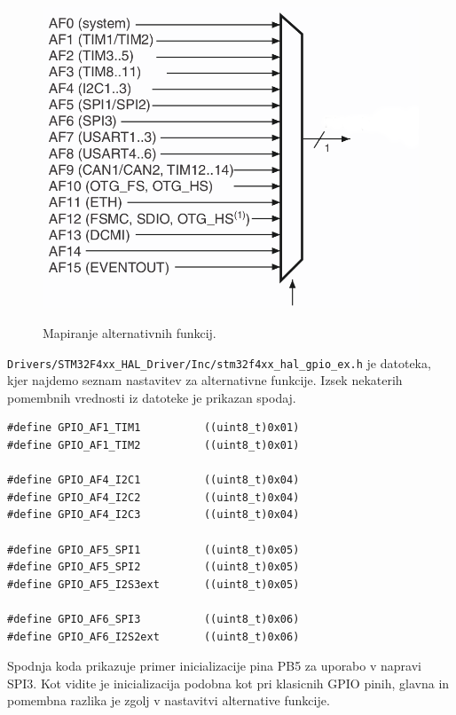 \documentclass[12pt,letterpaper]{article}
\begin{document}
\begin{figure}[ht!]
  \centering
  \caption{Mapiranje alternativnih funkcij.}
  \includegraphics{images/vaja5/SPI_AF.png}
  \label{SPI_AF}
\end{figure}

\texttt{Drivers/STM32F4xx\_HAL\_Driver/Inc/stm32f4xx\_hal\_gpio\_ex.h} je datoteka, kjer najdemo seznam nastavitev za alternativne funkcije. Izsek nekaterih pomembnih vrednosti iz datoteke je prikazan spodaj.

\begin{center}
\begin{lstlisting}[style=CStyle]
#define GPIO_AF1_TIM1          ((uint8_t)0x01)
#define GPIO_AF1_TIM2          ((uint8_t)0x01)

#define GPIO_AF4_I2C1          ((uint8_t)0x04)
#define GPIO_AF4_I2C2          ((uint8_t)0x04)
#define GPIO_AF4_I2C3          ((uint8_t)0x04)

#define GPIO_AF5_SPI1          ((uint8_t)0x05)
#define GPIO_AF5_SPI2          ((uint8_t)0x05)
#define GPIO_AF5_I2S3ext       ((uint8_t)0x05)

#define GPIO_AF6_SPI3          ((uint8_t)0x06)
#define GPIO_AF6_I2S2ext       ((uint8_t)0x06)
\end{lstlisting}
\end{center}

Spodnja koda prikazuje primer inicializacije pina PB5 za uporabo v napravi SPI3. Kot vidite je inicializacija podobna kot pri klasicnih GPIO pinih, glavna in pomembna razlika je zgolj v nastavitvi alternative funkcije.
\end{document}
